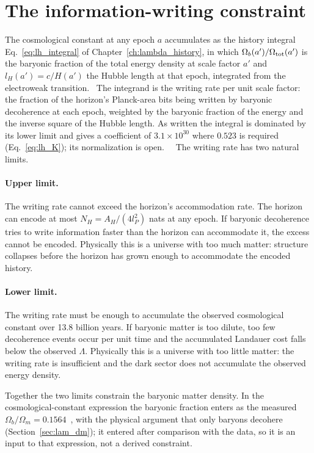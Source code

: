 \section{The information-writing constraint}\label{sec:bar_constraint}
The cosmological constant at any epoch $a$ accumulates as the history integral Eq.~\eqref{eq:lh_integral} of
Chapter~\ref{ch:lambda_history}, in which $\Omega_b(a')/\Omega_{\rm tot}(a')$ is the baryonic fraction of the total energy density at
scale factor $a'$ and $l_H(a')=c/H(a')$ the Hubble length at that epoch, integrated from the electroweak transition. \conjecture\ The
integrand is the writing rate per unit scale factor: the fraction of the horizon's Planck-area bits being written by baryonic
decoherence at each epoch, weighted by the baryonic fraction of the energy and the inverse square of the Hubble length. As written the
integral is dominated by its lower limit and gives a coefficient of $3.1\times10^{30}$ where $0.523$ is required (Eq.~\eqref{eq:lh_K});
its normalization is open. \calc\ \openprob\ The writing rate has two natural limits.

\paragraph{Upper limit.} The writing rate cannot exceed the horizon's accommodation rate. The horizon can encode at most
$N_H=A_H/(4l_P^2)$ nats at any epoch. If baryonic decoherence tries to write information faster than the horizon can accommodate it,
the excess cannot be encoded. Physically this is a universe with too much matter: structure collapses before the horizon has grown
enough to accommodate the encoded history. \conjecture

\paragraph{Lower limit.} The writing rate must be enough to accumulate the observed cosmological constant over 13.8 billion years. If
baryonic matter is too dilute, too few decoherence events occur per unit time and the accumulated Landauer cost falls below the observed
$\Lambda$. Physically this is a universe with too little matter: the writing rate is insufficient and the dark sector does not
accumulate the observed energy density. \conjecture

Together the two limits constrain the baryonic matter density. In the cosmological-constant expression the baryonic fraction enters
as the measured $\Omega_b/\Omega_m=0.1564$~\cite{Planck2018VI}, with the physical argument that only baryons decohere
(Section~\ref{sec:lam_dm}); it entered after comparison with the data, so it is an input to that expression, not a derived constraint.
\observed

